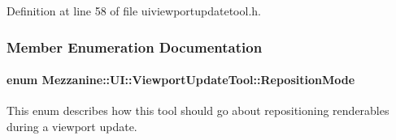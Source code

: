 Definition at line 58 of file uiviewportupdatetool.h.



\subsubsection{Member Enumeration Documentation}
\hypertarget{classMezzanine_1_1UI_1_1ViewportUpdateTool_ad2de82a6fc57859d914845ce676ff67e}{
\paragraph[{RepositionMode}]{\setlength{\rightskip}{0pt plus 5cm}enum {\bf Mezzanine::UI::ViewportUpdateTool::RepositionMode}}\hfill}
\label{classMezzanine_1_1UI_1_1ViewportUpdateTool_ad2de82a6fc57859d914845ce676ff67e}


This enum describes how this tool should go about repositioning renderables during a viewport update. 

